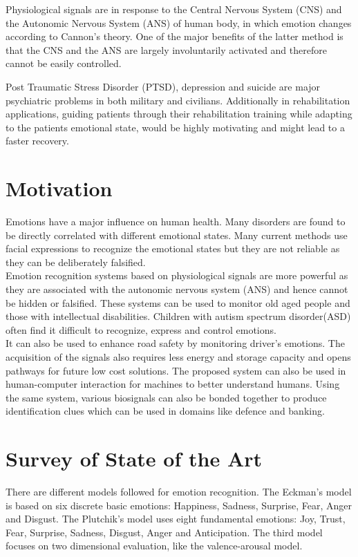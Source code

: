 \documentclass[11pt]{article}
\theoremstyle{definition}
\begin{document}
    Physiological signals are in response to the Central Nervous System (CNS) and the Autonomic Nervous System (ANS) of human body, in which emotion changes according to Cannon’s theory\cite{cannon_james-lange_1927}.
    One of the major benefits of the latter method is that the CNS and the ANS are largely involuntarily activated and therefore cannot be easily controlled.

    Post Traumatic Stress Disorder (PTSD), depression and suicide are major psychiatric problems in both military and civilians\cite{bryan_combat_2013, tarrier_suicide_2004}.
    Additionally in rehabilitation applications, guiding patients through their rehabilitation training while adapting to the patients emotional state, would be highly motivating and might lead to a faster recovery\cite{evans_positive_2011}.

  \section{Motivation}
    Emotions have a major influence on human health. 
    Many disorders are found to be directly correlated with different emotional states.
    Many current methods use facial expressions to recognize the emotional states but they are not reliable as they can be deliberately falsified. \\Emotion recognition systems based on physiological signals are more powerful as they are associated with the autonomic nervous system (ANS) and hence cannot be hidden or falsified\cite{cannon_james-lange_1927}. These systems can be used to monitor old aged people and those with intellectual disabilities. Children with autism spectrum disorder(ASD) often find it difficult to recognize, express and control emotions\cite{sparks_brain_2002}. \\
    It can also be used to enhance road safety by monitoring driver's emotions\cite{de_nadai_enhancing_2016}. 
    The acquisition of the signals also requires less energy and storage capacity and opens pathways for future low cost solutions. The proposed system can also be used in human-computer interaction for machines to better understand humans\cite{molina_emotional_2009}. Using the same system, various biosignals can also be bonded together to produce identification clues which can be used in domains like defence and banking\cite{kim_biometric_2009}.


  \section{Survey of State of the Art}
    There are different models followed for emotion recognition. 
    The Eckman's model is based on six discrete basic emotions: Happiness, Sadness, Surprise, Fear, Anger and Disgust\cite{ekman_universals_1987}. 
    The Plutchik's model uses eight fundamental emotions: Joy, Trust, Fear, Surprise, Sadness, Disgust, Anger and Anticipation\cite{plutchik_nature_2001}. 
    The third model\cite{russell_evidence_1977} focuses on two dimensional evaluation, like the valence-arousal model\cite{soleymani_multimodal_2012}.
\end{document}
